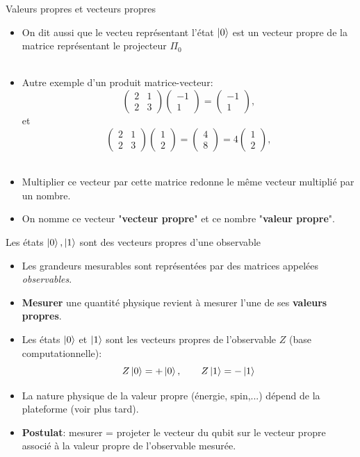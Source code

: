 \documentclass[aspectratio=169,12pt]{beamer}
\begin{document}
\begin{frame}{Valeurs propres et vecteurs propres}
  \begin{itemize}[<+->]
    \setlength{\itemsep}{0.6em}
    \item On dit aussi que le vecteu représentant l'état $\ket 0$ est un vecteur propre de la matrice représentant le projecteur $\Pi_0^{}$\\~\\
    \item Autre exemple d'un produit matrice-vecteur:   
    $$ \begin{pmatrix} 2 & 1 \\ 2 & 3 \end{pmatrix} \begin{pmatrix} -1 \\ 1 \end{pmatrix} = \begin{pmatrix} -1 \\ 1 \end{pmatrix},$$
    et 
    $$ \begin{pmatrix} 2 & 1 \\ 2 & 3 \end{pmatrix} \begin{pmatrix} 1 \\ 2 \end{pmatrix} = \begin{pmatrix} 4 \\ 8 \end{pmatrix} = 4 \begin{pmatrix} 1 \\ 2 \end{pmatrix},$$~\\
    \item Multiplier ce vecteur par cette matrice redonne le même vecteur multiplié par un nombre.
    \item On nomme ce vecteur "\textbf{vecteur propre}" et ce nombre "\textbf{valeur propre}".
  \end{itemize}
\end{frame}

\begin{frame}{Les états $\ket 0, \ket 1$ sont des vecteurs propres d'une observable}
  \begin{itemize}[<+->]
    \setlength{\itemsep}{0.6em}
    \item Les grandeurs mesurables sont représentées par des matrices appelées \textit{observables}.
    \item \textbf{Mesurer} une quantité physique revient à mesurer l'une de ses \textbf{valeurs propres}.
    \item Les états $\ket{0}$ et $\ket{1}$ sont les vecteurs propres de l'observable $Z$
     (base computationnelle):
    $$Z\ket{0} = +\ket{0}, \qquad Z\ket{1} = -\ket{1}$$
    \item La nature physique de la valeur propre (énergie, spin,...) dépend de la plateforme (voir plus tard).
    \item \textbf{Postulat}: mesurer = projeter le vecteur du qubit sur le vecteur propre associé à la
     valeur propre de l'observable mesurée.
  \end{itemize}
\end{frame}
\end{document}
